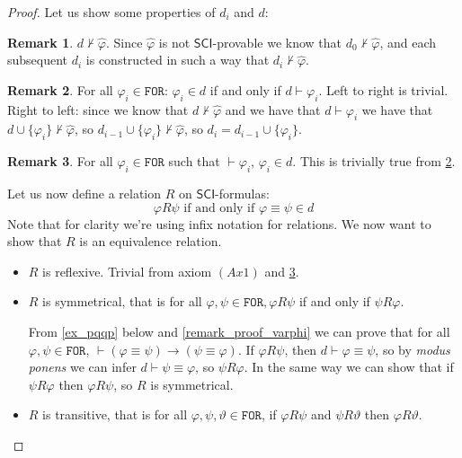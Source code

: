 \documentclass{article}
\theoremstyle{definition}
\theoremstyle{definition}
\theoremstyle{definition}
\newtheorem{remark}{Remark}[section]
\newcommand*{\id}{\equiv}
\newcommand*{\ra}{\rightarrow}
\newcommand*{\FOR}{\texttt{FOR}}
\newcommand{\SCI}{$\mathsf{SCI}$\xspace}
\begin{document}
\begin{proof}
    Let us show some properties of $d_i$ and $d$:
    \begin{remark}
        $d \not \vdash \hat{\varphi}$. Since $\hat{\varphi}$ is not \SCI-provable we know that $d_0 \not \vdash \hat{\varphi}$, and each subsequent $d_i$ is constructed in such a way that $d_i \not \vdash \hat{\varphi}$.
    \end{remark}
    \begin{remark}
        \label{d_in_same_follows}
        For all $\varphi_i \in \FOR$: $\varphi_i \in d$ if and only if $d \vdash
            \varphi_i$. Left to right is trivial. Right to left: since we know that $d \not
            \vdash \hat{\varphi}$ and we have that $d \vdash \varphi_i$ we have that $d
            \cup \{\varphi_i\} \not \vdash \hat{\varphi}$, so $d_{i-1} \cup \{\varphi_i\} \not \vdash \hat{\varphi}$, so $d_i = d_{i-1} \cup
            \{\varphi_i\}$.
    \end{remark}
    \begin{remark}
        \label{d_has_theorems}
        For all $\varphi_i \in \FOR$ such that $\vdash \varphi_i$, $\varphi_i \in d$. This is trivially true from \cref{d_in_same_follows}.
    \end{remark}
    Let us now define a relation $R$ on \SCI-formulas: $$ \varphi R \psi \text{ if
            and only if } \varphi \id \psi \in d $$
    Note that for clarity we're using infix notation for relations. We now want to
    show that $R$ is an equivalence relation.
    \begin{itemize}[]
        \item $R$ is reflexive. Trivial from axiom $(Ax1)$ and \cref{d_has_theorems}.
        \item $R$ is symmetrical, that is for all $\varphi, \psi \in \FOR, \varphi R \psi$ if and only if $\psi R \varphi$.

              From \cref{ex_pqqp} below and \cref{remark_proof_varphi} we can prove that for
              all $\varphi, \psi \in \FOR$, $\vdash (\varphi \id \psi) \ra (\psi \id
                  \varphi)$. If $\varphi R \psi$, then $d \vdash \varphi \id \psi$, so by
              \emph{modus ponens} we can infer $d \vdash \psi \id \varphi$, so $\psi R
                  \varphi$. In the same way we can show that if $\psi R \varphi$ then $\varphi R
                  \psi$, so $R$ is symmetrical.
        \item $R$ is transitive, that is for all $\varphi, \psi, \vartheta \in \FOR$, if $\varphi R \psi$ and $\psi R \vartheta$ then $\varphi R \vartheta$.


\end{itemize}
\end{proof}
\end{document}

